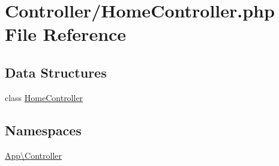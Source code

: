 \hypertarget{_home_controller_8php}{}\section{Controller/\+Home\+Controller.php File Reference}
\label{_home_controller_8php}
\subsection*{Data Structures}
\begin{DoxyCompactItemize}
\item 
class \mbox{\hyperlink{class_app_1_1_controller_1_1_home_controller}{Home\+Controller}}
\end{DoxyCompactItemize}
\subsection*{Namespaces}
\begin{DoxyCompactItemize}
\item 
 \mbox{\hyperlink{namespace_app_1_1_controller}{App\textbackslash{}\+Controller}}
\end{DoxyCompactItemize}

